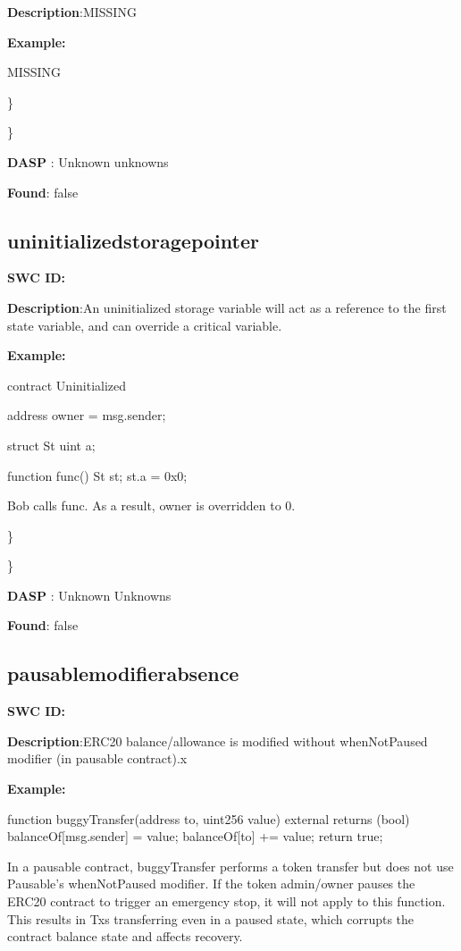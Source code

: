 \documentclass{article}
\begin{document}
{\textbf{Description}:MISSING


\textbf{Example:} 

MISSING

\} 

\} 

\textbf{DASP} : Unknown unknowns

\textbf{Found}: false

\subsection{uninitialized\textunderscore storage\textunderscore pointer} 
\textbf{SWC \textunderscore ID:} 

\textbf{Description}:An uninitialized storage variable will act as a reference to the first state variable, and can override a critical variable.


\textbf{Example:} 

contract Uninitialized{
    address owner = msg.sender;

    struct St{
        uint a;
    }

    function func() {
        St st;
        st.a = 0x0;
    }
}
Bob calls func. As a result, owner is overridden to 0.

\} 

\} 

\textbf{DASP} : Unknown Unknowns

\textbf{Found}: false

\subsection{pausable\textunderscore modifier\textunderscore absence} 
\textbf{SWC \textunderscore ID:} 

\textbf{Description}:ERC20 balance/allowance is modified without whenNotPaused modifier (in pausable contract).x


\textbf{Example:} 

function buggyTransfer(address to, uint256 value) external returns (bool){
        balanceOf[msg.sender] \textendash = value;
        balanceOf[to] += value;
        return true;
    }

In a pausable contract, buggyTransfer performs a token transfer but does not use Pausable's whenNotPaused modifier. If the token admin/owner pauses the ERC20 contract to trigger an emergency stop, it will not apply to this function. This results in Txs transferring even in a paused state, which corrupts the contract balance state and affects recovery.

}
\end{document}
